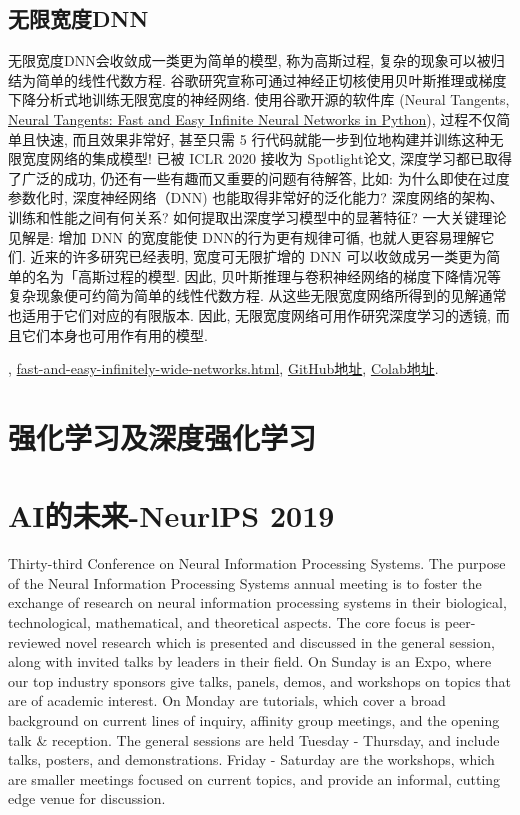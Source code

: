 \subsection{无限宽度DNN}
无限宽度DNN会收敛成一类更为简单的模型, 称为高斯过程, 复杂的现象可以被归结为简单的线性代数方程.
谷歌研究宣称可通过神经正切核使用贝叶斯推理或梯度下降分析式地训练无限宽度的神经网络. 
使用谷歌开源的软件库 (Neural Tangents, \href{www.github.com/google/neural-tangents}{Neural Tangents: Fast and Easy Infinite Neural Networks in Python}),
过程不仅简单且快速, 而且效果非常好, 甚至只需 5 行代码就能一步到位地构建并训练这种无限宽度网络的集成模型!
已被 ICLR 2020 接收为 Spotlight论文, 深度学习都已取得了广泛的成功, 仍还有一些有趣而又重要的问题有待解答, 
比如: 为什么即使在过度参数化时, 深度神经网络（DNN) 也能取得非常好的泛化能力?
深度网络的架构、训练和性能之间有何关系? 如何提取出深度学习模型中的显著特征?
一大关键理论见解是: 增加 DNN 的宽度能使 DNN的行为更有规律可循, 也就人更容易理解它们. 
近来的许多研究已经表明, 宽度可无限扩增的 DNN 可以收敛成另一类更为简单的名为「高斯过程的模型. 
因此, 贝叶斯推理与卷积神经网络的梯度下降情况等复杂现象便可约简为简单的线性代数方程.
从这些无限宽度网络所得到的见解通常也适用于它们对应的有限版本. 
因此, 无限宽度网络可用作研究深度学习的透镜, 而且它们本身也可用作有用的模型.

\href{https://arxiv.org/abs/1912.02803{论文地址}},
\href{https://ai.googleblog.com/2020/03/fast-and-easy-infinitely-wide-networks.html}{fast-and-easy-infinitely-wide-networks.html},
\href{https://github.com/google/neural-tangents}{GitHub地址},
\href{https://colab.research.google.com/github/google/neural-tangents/blob/master/notebooks/neural_tangents_cookbook.ipynb}{Colab地址}.

\section{强化学习及深度强化学习}
\section{AI的未来-NeurlPS 2019}
Thirty-third Conference on Neural Information Processing Systems. The purpose of the Neural Information Processing Systems annual meeting is to foster the exchange of research on neural information processing systems in their biological, technological, mathematical, and theoretical aspects. The core focus is peer-reviewed novel research which is presented and discussed in the general session, along with invited talks by leaders in their field. On Sunday is an Expo, where our top industry sponsors give talks, panels, demos, and workshops on topics that are of academic interest. On Monday are tutorials, which cover a broad background on current lines of inquiry, affinity group meetings, and the opening talk \& reception. The general sessions are held Tuesday - Thursday, and include talks, posters, and demonstrations. Friday - Saturday are the workshops, which are smaller meetings focused on current topics, and provide an informal, cutting edge venue for discussion.

